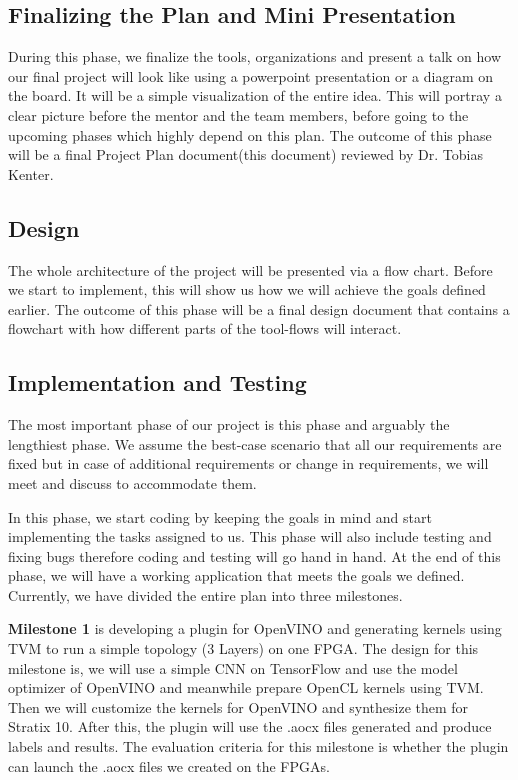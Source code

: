 \documentclass[titlepage]{report}
\begin{document}
\subsection{Finalizing the Plan and Mini Presentation}
During this phase, we finalize the tools, organizations and present a talk on how our final project will look like using a powerpoint presentation or a diagram on the board. It will be a simple visualization of the entire idea. This will portray a clear picture before the mentor and the team members, before going to the upcoming phases which highly depend on this plan. The outcome of this phase will be a final Project Plan document(this document) reviewed by Dr. Tobias Kenter. 

\subsection{Design}
The whole architecture of the project will be presented via a flow chart. Before we start to implement, this will show us how we will achieve the goals defined earlier. The outcome of this phase will be a final design document that contains a flowchart with how different parts of the tool-flows will interact.  

\subsection{Implementation and Testing}
The most important phase of our project is this phase and arguably the lengthiest phase. We assume the best-case scenario that all our requirements are fixed but in case of additional requirements or change in requirements, we will meet and discuss to accommodate them. 

In this phase, we start coding by keeping the goals in mind and start implementing the tasks assigned to us. This phase will also include testing and fixing bugs therefore coding and testing will go hand in hand. At the end of this phase, we will have a working application that meets the goals we defined. Currently, we have divided the entire plan into three milestones. 

\textbf{Milestone 1} is developing a plugin for OpenVINO and generating kernels using TVM to run a simple topology (3 Layers) on one FPGA. The design for this milestone is, we will use a simple CNN on TensorFlow and use the model optimizer of OpenVINO and meanwhile prepare OpenCL kernels using TVM. Then we will customize the kernels for OpenVINO and synthesize them for Stratix 10. After this, the plugin will use the .aocx files generated and produce labels and results. The evaluation criteria for this milestone is whether the plugin can launch the .aocx files we created on the FPGAs. 
\end{document}
